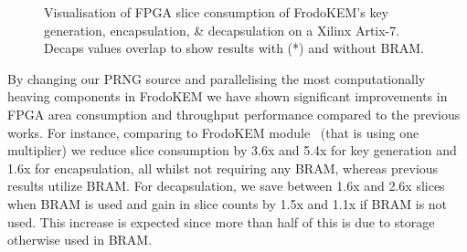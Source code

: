 \begin{table}[!t]
\centering
\caption{FPGA resource consumption of the proposed FrodoKEM PRNG and Error Sampler designs. All results utilize a Xilinx Artix-7 FPGA.}\label{tab:otherresults}
\noindent{}
\end{table}

\begin{figure}[h]
\centering
\resizebox{0.8\textwidth}{!}{%

}
\caption{Visualisation of FPGA slice consumption of FrodoKEM's key generation, encapsulation, \& decapsulation on a Xilinx Artix-7. Decaps values overlap to show results with (*) and without BRAM.}
\label{fig:hw}
\end{figure}

By changing our PRNG source and parallelising the most computationally heaving components in FrodoKEM we have shown significant improvements in FPGA area consumption and throughput performance compared to the previous works. For instance, comparing to FrodoKEM module~\cite{howe2018standard} (that is using one multiplier) we reduce slice consumption by 3.6x and 5.4x for key generation and 1.6x for encapsulation, all whilst not requiring any BRAM, whereas previous results utilize BRAM. For decapsulation, we save between 1.6x and 2.6x slices when BRAM is used and gain in slice counts by 1.5x and 1.1x if BRAM is not used. This increase is expected since more than half of this is due to storage otherwise used in BRAM.

